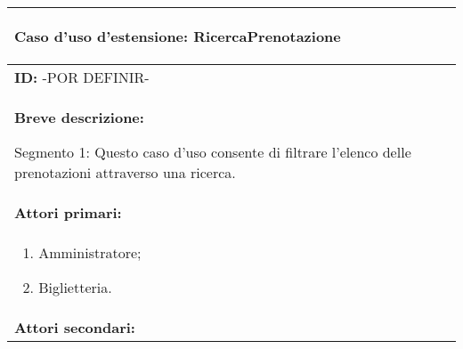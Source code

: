 \documentclass{article}
\begin{document}
\begin{table}[t]
    \centering
    \begin{tabular}{|p{\linewidth}|}
        \hline
        \cellcolor{gray!100}
        \color{white}
        \begin{center}
            \textbf{Caso d'uso d'estensione:} RicercaPrenotazione
        \end{center} \\
        \hline
        \textbf{ID:} -POR DEFINIR- \\
        \hline
        \cellcolor{gray!20}
        \textbf{Breve descrizione:}

        Segmento 1: Questo caso d'uso consente di filtrare l'elenco delle prenotazioni attraverso una ricerca. \\
        \hline
        \textbf{Attori primari:} \\
        \begin{minipage}{\linewidth}
            \begin{enumerate}[noitemsep]
                \item Amministratore;
                \item Biglietteria.
            \end{enumerate}
        \end{minipage}
        \vspace{-5pt} \\
        \hline
        \textbf{Attori secondari:}


\end{tabular}
\end{table}
\end{document}
